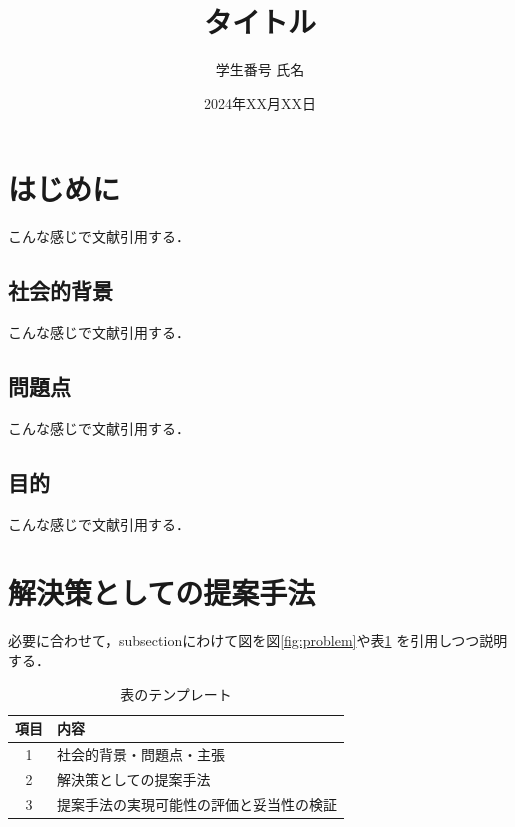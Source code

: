 \documentclass[uplatex,dvipdfmx]{jsarticle}
\begin{document}
\title{タイトル}
\author{学生番号 氏名}
\date{2024年XX月XX日}
\maketitle
\section{はじめに}
こんな感じで文献引用する\cite{ref:nobukawa2023,ref:nobukawa2023_2}．

\subsection{社会的背景}
こんな感じで文献引用する\cite{ref:nobukawa2023,ref:nobukawa2023_2}．

\subsection{問題点}

こんな感じで文献引用する\cite{ref:nobukawa2023,ref:nobukawa2023_2}．

\subsection{目的}
こんな感じで文献引用する\cite{ref:nobukawa2023,ref:nobukawa2023_2}．

\section{解決策としての提案手法}
必要に合わせて，subsectionにわけて図を図\ref{fig:problem}や表\ref{table:presentation}
を引用しつつ説明する．

\begin{table}[h]
  \centering
  \caption{表のテンプレート}
  \label{table:presentation}
  \begin{tabular}{cl}
\hline
項目 & 内容 \\\hline \hline
1 & 社会的背景・問題点・主張 \\ \hline
2 & 解決策としての提案手法\\ \hline
3 & 提案手法の実現可能性の評価と妥当性の検証\\ \hline
  \end{tabular}  
\end{table}
\end{document}
